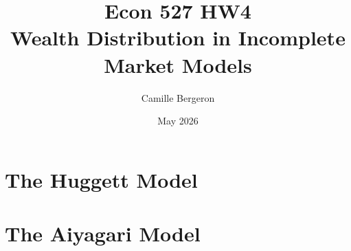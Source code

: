 \documentclass{article}
\title{Econ 527 HW4 \\ Wealth Distribution in Incomplete Market Models}
\author{Camille Bergeron}
\date{May 2026}
\begin{document}
\maketitle

\section{The Huggett Model}



\section{The Aiyagari Model}
\end{document}
